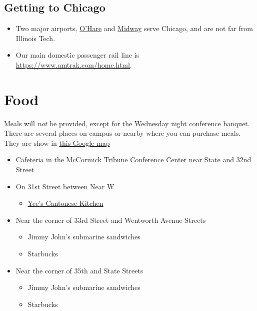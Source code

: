 \subsection{Getting to Chicago}

\begin{itemize}
  \item Two major airports, \href{https://www.flychicago.com/ohare/home/Pages/default.aspx}{O'Hare} and \href{https://www.flychicago.com/midway/pages/default.aspx}{Midway} serve Chicago, and are not far from Illinois Tech.  
  \item Our main domestic passenger rail line is \href{Amtrak}{https://www.amtrak.com/home.html}.
\end{itemize}


\section{Food}

Meals will \emph{not} be provided, except for the Wednesday night conference banquet. There are several places on campus or nearby where you can purchase meals.  They are show in \href{https://www.google.com/maps/d/u/1/edit?mid=1QH5guZDg-m8_f1oO9HgZ5sIL76q1gdk&usp=sharing}{this Google map}


\begin{itemize}
	\item Cafeteria in the McCormick Tribune Conference Center near State and 32nd Street
	\item On 31st Street between Near W
	\begin{itemize}
		\item \href{https://www.yelp.com/biz/yees-cantonese-kitchen-chicago-2?osq=Restaurants} {Yee's Cantonese Kitchen}  
	\end{itemize}
		\item Near the corner of 33rd Street and Wentworth Avenue Streets
	\begin{itemize}
		\item Jimmy John's submarine sandwiches
		\item Starbucks
	\end{itemize}
	
	\item Near the corner of 35th and State Streets
	\begin{itemize}
		\item Jimmy John's submarine sandwiches
		\item Starbucks
	\end{itemize}


\end{itemize}



